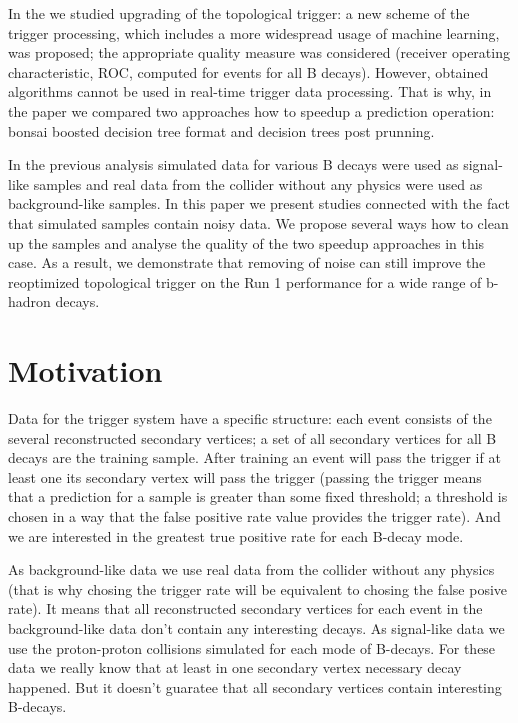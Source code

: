\documentclass{llncs}
\begin{document}
In the \cite{run2_topo} we studied upgrading of the topological trigger: a new scheme of the trigger processing, which includes a more widespread usage of machine learning, was proposed; the appropriate quality measure was considered (receiver operating characteristic, ROC, computed for events for all B decays). However, obtained algorithms cannot be used in real-time trigger data processing. That is why, in the paper \cite{run2_topo} we compared two approaches how to speedup a prediction operation: bonsai boosted decision tree format \cite{bbdt} and decision trees post prunning. 

In the previous analysis \cite{run2_topo} simulated data for various B decays were used as signal-like samples and real data from the collider without any physics were used as background-like samples. In this paper we present studies connected with the fact that simulated samples contain noisy data. We propose several ways how to clean up the samples and analyse the quality of the two speedup approaches in this case. As a result, we demonstrate that removing of noise can still improve the reoptimized topological trigger on the Run 1 performance for a wide range of b-hadron decays.

\section{Motivation}
Data for the trigger system have a specific structure: each event consists of the several reconstructed secondary vertices; a set of all secondary vertices for all B decays are the training sample. After training an event will pass the trigger if at least one its secondary vertex will pass the trigger (passing the trigger means that a prediction for a sample is greater than some fixed threshold; a threshold is chosen in a way that the false positive rate value provides the trigger rate). And we are interested in the greatest true positive rate for each B-decay mode. 

As background-like data we use real data from the collider without any physics (that is why chosing the trigger rate will be equivalent to chosing the false posive rate). It means that all reconstructed secondary vertices for each event in the background-like data don't contain any interesting decays. As signal-like data we use the proton-proton collisions simulated for each mode of B-decays. For these data we really know that at least in one secondary vertex necessary decay happened. But it doesn't guaratee that all secondary vertices contain interesting B-decays.
\end{document}
